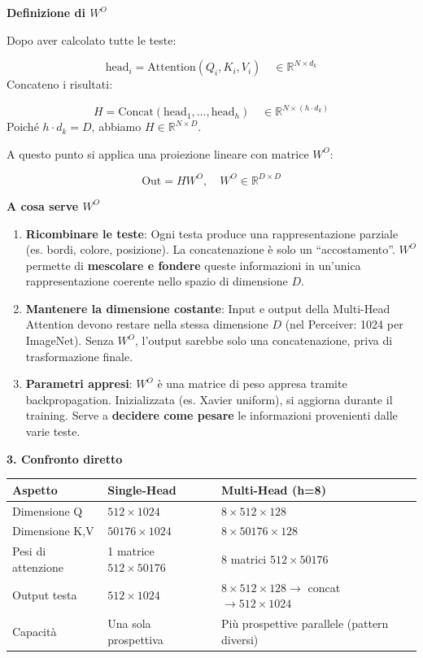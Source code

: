 \documentclass[
  11pt,
]{article}
\begin{document}
\textbf{Definizione di $W^O$}

Dopo aver calcolato tutte le teste:

\[
\text{head}_i = \text{Attention}(Q_i, K_i, V_i) \quad \in \mathbb{R}^{N \times d_k}
\]
Concateno i risultati:

\[
H = \text{Concat}(\text{head}_1, \ldots, \text{head}_h) \quad \in \mathbb{R}^{N \times (h \cdot d_k)}
\]
Poiché $h \cdot d_k = D$, abbiamo $H \in \mathbb{R}^{N \times D}$.

A questo punto si applica una proiezione lineare con matrice $W^O$:

\[
\text{Out} = H W^O, \quad W^O \in \mathbb{R}^{D \times D}
\]

\textbf{A cosa serve $W^O$}
\begin{enumerate}
\item \textbf{Ricombinare le teste}: Ogni testa produce una rappresentazione parziale (es. bordi, colore, posizione). La concatenazione è solo un ``accostamento''. $W^O$ permette di \textbf{mescolare e fondere} queste informazioni in un'unica rappresentazione coerente nello spazio di dimensione $D$.
\item \textbf{Mantenere la dimensione costante}: Input e output della Multi-Head Attention devono restare nella stessa dimensione $D$ (nel Perceiver: 1024 per ImageNet). Senza $W^O$, l'output sarebbe solo una concatenazione, priva di trasformazione finale.
\item \textbf{Parametri appresi}: $W^O$ è una matrice di peso appresa tramite backpropagation. Inizializzata (es. Xavier uniform), si aggiorna durante il training. Serve a \textbf{decidere come pesare} le informazioni provenienti dalle varie teste.
\end{enumerate}

\textbf{3. Confronto diretto}

\begin{center}
\begin{tabular}{l l l}
\hline
\textbf{Aspetto} & \textbf{Single-Head} & \textbf{Multi-Head (h=8)} \\
\hline
Dimensione Q & $512 \times 1024$ & $8 \times 512 \times 128$ \\
Dimensione K,V & $50176 \times 1024$ & $8 \times 50176 \times 128$ \\
Pesi di attenzione & 1 matrice $512 \times 50176$ & 8 matrici $512 \times 50176$ \\
Output testa & $512 \times 1024$ & $8 \times 512 \times 128 \to$ concat $\to 512 \times 1024$ \\
Capacità & Una sola prospettiva & Più prospettive parallele (pattern diversi) \\
\hline
\end{tabular}
\end{center}
\end{document}
